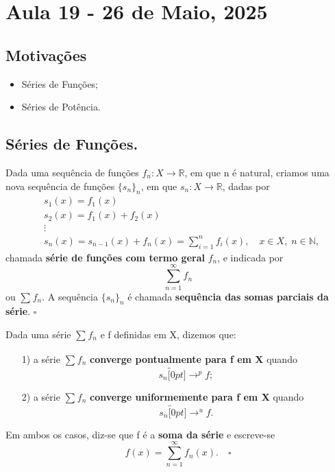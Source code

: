 \documentclass[../analysisII_notes.tex]{subfiles}
\begin{document}
\section{Aula 19 - 26 de Maio, 2025}
\subsection{Motivações}
\begin{itemize}
	\item Séries de Funções;
	\item Séries de Potência.
\end{itemize}
\subsection{Séries de Funções.}
\begin{def*}
	Dada uma sequência de funções \(f_{n}:X\rightarrow \mathbb{R}\), em que n é natural, criamos uma nova sequência de funções \(\{s_{n}\}_{n}\), em que \(s_{n}:X\rightarrow \mathbb{R}\), dadas por
	\begin{align*}
		 & s_1(x) = f_1(x)                                                                                 \\
		 & s_2(x) = f_1(x) + f_2(x)                                                                        \\
		 & \vdots                                                                                          \\
		 & s_{n}(x) = s_{n-1}(x)+f_{n}(x)= \sum\limits_{i=1}^{n}f_{i}(x), \quad x\in X,\; n\in \mathbb{N},
	\end{align*}
	chamada \textbf{série de funções com termo geral }\(f_{n}\), e indicada por
	\[
		\sum\limits_{n=1}^{\infty}f_{n}
	\]
	ou \(\sum\limits_{}^{}f_{n}\). A sequência \(\{s_{n}\}_{n}\) é chamada \textbf{sequência das somas parciais da série}. \(\square\)
\end{def*}
\begin{def*}
	Dada uma série \(\sum\limits_{}^{}f_{n}\) e f definidas em X, dizemos que:
	\begin{itemize}
		\item[1)] a série \(\sum\limits_{}^{}f_{n}\) \textbf{converge pontualmente para f em X} quando
		      \[
			      s_{n}\overbracket[0pt]{\rightarrow}^{p}f;
		      \]
		\item[2)] a série \(\sum\limits_{}^{}f_{n}\) \textbf{converge uniformemente para f em X} quando
		      \[
			      s_{n}\overbracket[0pt]{\rightarrow}^{u}f.
		      \]
	\end{itemize}
	Em ambos os casos, diz-se que f é a \textbf{soma da série} e escreve-se
	\[
		f(x) = \sum\limits_{n=1}^{\infty}f_{n}(x). \quad \square
	\]
\end{def*}
\end{document}

